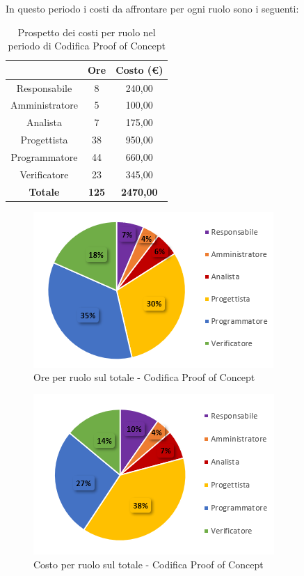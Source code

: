 \pagebreak
   In questo periodo i costi da affrontare per ogni ruolo sono i seguenti:
   
   \begin{table}[H]
       \centering
       \renewcommand{\arraystretch}{1.8}
       \begin{tabular}{c|c|c}
         \rowcolor[HTML]{125E28} 
         \multicolumn{1}{c}{\color[HTML]{FFFFFF}\textbf{Ruolo}}
         & \multicolumn{1}{c}{\color[HTML]{FFFFFF}\textbf{Ore}}
         & \multicolumn{1}{c}{\color[HTML]{FFFFFF}\textbf{Costo (€)}}\\
         \hline
         Responsabile   & 8 & 240,00\\
         Amministratore & 5 & 100,00\\
         Analista       & 7 & 175,00\\
         Progettista    & 38 & 950,00\\
         Programmatore  & 44 & 660,00\\
         Verificatore   & 23 & 345,00\\
         \textbf{Totale} & \textbf{125} & \textbf{2470,00}
       \end{tabular}
       \caption{Prospetto dei costi per ruolo nel periodo di Codifica Proof of Concept\glo}
     \end{table}
   
     \begin{figure}[H]
       \centering
        \includegraphics[scale=1]{immagini/ore_ruolo_PoC.png}
        \caption{Ore per ruolo sul totale - Codifica Proof of Concept\glo}
      \end{figure}
   
     \begin{figure}[H]
       \centering
        \includegraphics[scale=1]{immagini/costo_ruolo_PoC.png}
        \caption{Costo per ruolo sul totale - Codifica Proof of Concept\glo}
      \end{figure}
   
